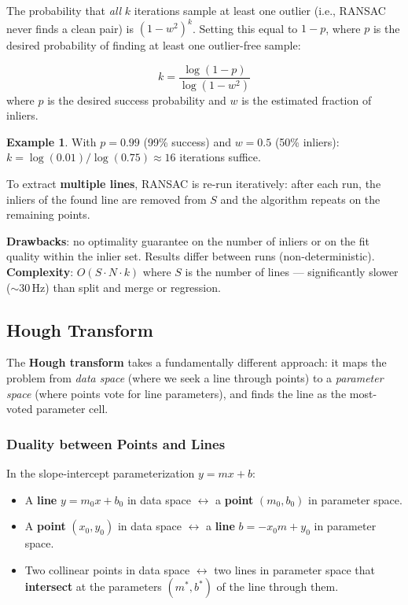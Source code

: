 \documentclass[11pt,a4paper]{article}
\theoremstyle{definition}
\newtheorem{example}{Example}[section]
\theoremstyle{plain}
\theoremstyle{remark}
\begin{document}
The probability that \textit{all} $k$ iterations sample at least one outlier (i.e., RANSAC never finds a clean pair) is $(1-w^2)^k$. Setting this equal to $1 - p$, where $p$ is the desired probability of finding at least one outlier-free sample:

\begin{tcolorbox}[colback=blue!5!white,colframe=blue!75!black,title=\textbf{RANSAC: Required Number of Iterations}]
\[
k = \frac{\log(1 - p)}{\log(1 - w^2)}
\]
where $p$ is the desired success probability and $w$ is the estimated fraction of inliers.
\end{tcolorbox}

\begin{example}
With $p = 0.99$ (99\% success) and $w = 0.5$ (50\% inliers): $k = \log(0.01)/\log(0.75) \approx 16$ iterations suffice.
\end{example}

To extract \textbf{multiple lines}, RANSAC is re-run iteratively: after each run, the inliers of the found line are removed from $S$ and the algorithm repeats on the remaining points.

\textbf{Drawbacks}: no optimality guarantee on the number of inliers or on the fit quality within the inlier set. Results differ between runs (non-deterministic). \textbf{Complexity}: $O(S \cdot N \cdot k)$ where $S$ is the number of lines — significantly slower ($\sim 30\,\text{Hz}$) than split and merge or regression.

\subsection{Hough Transform}

The \textbf{Hough transform} takes a fundamentally different approach: it maps the problem from \textit{data space} (where we seek a line through points) to a \textit{parameter space} (where points vote for line parameters), and finds the line as the most-voted parameter cell.

\subsubsection*{Duality between Points and Lines}

In the slope-intercept parameterization $y = mx + b$:
\begin{itemize}
    \item A \textbf{line} $y = m_0 x + b_0$ in data space $\leftrightarrow$ a \textbf{point} $(m_0, b_0)$ in parameter space.
    \item A \textbf{point} $(x_0, y_0)$ in data space $\leftrightarrow$ a \textbf{line} $b = -x_0 m + y_0$ in parameter space.
    \item Two collinear points in data space $\leftrightarrow$ two lines in parameter space that \textbf{intersect} at the parameters $(m^*, b^*)$ of the line through them.
\end{itemize}
\end{document}
